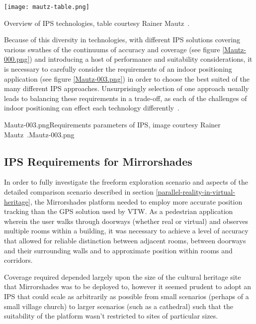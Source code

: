 \begin{table}
	\begin{center}
		\texttt{[image: mautz-table.png]}
	\end{center}
	\caption{Overview of IPS technologies, table courtesy Rainer Mautz~\cite{Mautz2012}.}
	\label{mautz-table.png}
\end{table}

Because of this diversity in technologies, with different IPS solutions covering various swathes of the continuums of accuracy and coverage (see figure \ref{Mautz-000.png}) and introducing a host of performance and suitability considerations, it is necessary to carefully consider the requirements of an indoor positioning application (see figure \ref{Mautz-003.png}) in order to choose the best suited of the many different IPS approaches. Unsurprisingly selection of one approach usually leads to balancing these requirements in a trade-off, as each of the challenges of indoor positioning can effect each technology differently~\cite{Mautz2009}.

       {Mautz-003.png}{Requirements parameters of IPS, image courtesy Rainer Mautz~\cite{Mautz2012}.}{Mautz-003.png}


\subsection{IPS Requirements for Mirrorshades}
\label{ips-requirements-for-mirrorshades}
In order to fully investigate the freeform exploration scenario and aspects of the detailed comparison scenario described in section \ref{parallel-reality-in-virtual-heritage}, the Mirrorshades platform needed to employ more accurate position tracking than the GPS solution used by VTW. As a pedestrian application wherein the user walks through doorways (whether real or virtual) and observes multiple rooms within a building, it was necessary to achieve a level of accuracy that allowed for reliable distinction between adjacent rooms, between doorways and their surrounding walls and to approximate position within rooms and corridors.

Coverage required depended largely upon the size of the cultural heritage site that Mirrorshades was to be deployed to, however it seemed prudent to adopt an IPS that could scale as arbitrarily as possible from small scenarios (perhaps of a small village church) to larger scenarios (such as a cathedral) such that the suitability of the platform wasn't restricted to sites of particular sizes.

